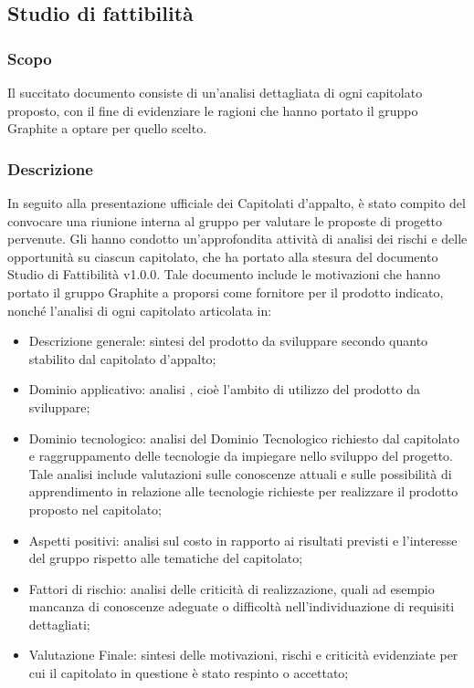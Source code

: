 \documentclass[../NomeDocumento.tex]{subfiles}
\begin{document}

\subsection{Studio di fattibilità}

\subsubsection{Scopo}

Il succitato documento consiste di un'analisi dettagliata di ogni capitolato proposto, con il fine di evidenziare le ragioni che hanno portato il gruppo Graphite a optare per quello scelto. 

\subsubsection{Descrizione}
In seguito alla presentazione ufficiale dei Capitolati d'appalto, è
stato compito del  convocare una riunione interna al gruppo per valutare le proposte di progetto pervenute. Gli  hanno condotto un'approfondita attività di analisi dei rischi e delle opportunità su ciascun capitolato, che ha portato alla stesura del documento Studio di Fattibilità v1.0.0.
Tale documento include le motivazioni che hanno portato il gruppo Graphite a proporsi come fornitore per il prodotto indicato, nonché l'analisi di ogni capitolato articolata in:

\begin{itemize}
    \item{ Descrizione generale:} sintesi del prodotto da sviluppare secondo quanto stabilito dal capitolato d'appalto;
    
    \item{Dominio applicativo:} analisi , cioè l'ambito di utilizzo del prodotto da sviluppare;
    
    \item{Dominio tecnologico:} analisi del Dominio Tecnologico richiesto dal capitolato e raggruppamento delle tecnologie da impiegare nello sviluppo del progetto. Tale analisi include valutazioni sulle conoscenze attuali e sulle possibilità di apprendimento in relazione alle tecnologie richieste per realizzare il prodotto proposto nel capitolato;
    
    \item{Aspetti positivi:} analisi sul costo in rapporto ai risultati previsti e l’interesse del gruppo rispetto alle tematiche del capitolato;
    
    \item{Fattori di rischio:} analisi delle criticità di realizzazione, quali ad esempio mancanza di conoscenze adeguate o difficoltà nell’individuazione di requisiti dettagliati;
    
    \item{Valutazione Finale:} sintesi delle motivazioni, rischi e criticità evidenziate per cui il capitolato in questione è stato respinto o accettato;
\end{itemize}
\end{document}
